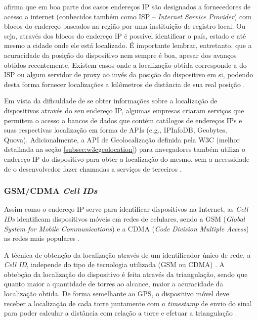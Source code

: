 \documentclass[diss]{template/setrem}
\begin{document}
\citet{Holdener2011} afirma que em boa parte dos casos endereços IP são designados a fornecedores de acesso a internet (conhecidos também como ISP -- \emph{Internet Service Provider}) com blocos do endereço baseados na região por uma instituição de registro local. Ou seja, através dos blocos do endereço IP é possível identificar o país, estado e até mesmo a cidade onde ele está localizado. É importante lembrar, entretanto, que a acuracidade da posição do dispositivo nem sempre é boa, apesar dos avanços obtidos recentemente. Existem casos onde a localização obtida corresponde a do ISP ou algum servidor de proxy ao invés da posição do dispositivo em si, podendo desta forma fornecer localizações a kilômetros de distância de sua real posição \citep{Holdener2011}.

Em vista da dificuldade de se obter informações sobre a localização de dispositivos através do seu endereço IP, algumas empresas criaram serviços que permitem o acesso a bancos de dados que contém catálogos de endereços IPs e suas respectivas localização em forma de APIs (e.g., IPInfoDB, Geobytes, Quova). Adicionalmente, a API de Geolocalização definida pela W3C (melhor detalhada na seção \ref{subsec:w3cgeolocation}) para navegadores também utiliza o endereço IP do dispositivo para obter a localização do mesmo, sem a necessidade de o desenvolvedor fazer chamadas a serviços de terceiros \citep{Holdener2011}.

\subsubsection{GSM/CDMA \textit{Cell IDs}}
Assim como o endereço IP serve para identificar dispositivos na Internet, as \emph{Cell IDs} identificam dispositivos móveis em redes de celulares, sendo a GSM (\emph{Global System for Mobile Communications}) e a CDMA (\emph{Code Division Multiple Access}) as redes mais populares \citep{Holdener2011}.

A técnica de obtenção da localização através de um identificador único de rede, a \emph{Cell ID}, independe do tipo de tecnologia utilizada (GSM ou CDMA) \citep{Holdener2011}. A obtebção da localização do dispositivo é feita através da triangulação, sendo que quanto maior a quantidade de torres ao alcance, maior a acuracidade da localização obtida. De forma semelhante ao GPS, o dispositivo móvel deve receber a localização de cada torre juntamente com o \emph{timestamp} de envio do sinal para poder calcular a distância com relação a torre e efetuar a triangulação \citep{Trevisani2004}.
\end{document}
